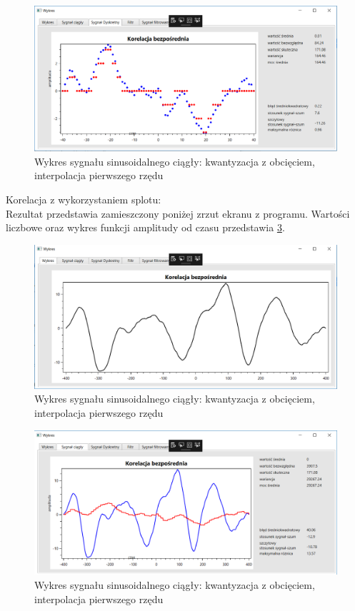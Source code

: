 \documentclass[12pt]{article}
\begin{document}
\newpage
\begin{figure}[h!]
 \centering
 \includegraphics[width=12.3cm]{korBD.PNG}
 \vspace{-0.3cm}
 \caption{Wykres sygnału sinusoidalnego ciągły: kwantyzacja z obcięciem, interpolacja pierwszego rzędu}
 \label{Wykres dla wynikw eksperymentu pierwszego}
\end{figure}

Korelacja z wykorzystaniem splotu:
\\Rezultat przedstawia zamieszczony poniżej zrzut ekranu z programu. Wartości liczbowe oraz wykres funkcji amplitudy od czasu przedstawia \ref{Wykres dla wynikw eksperymentu pierwszego}.
\begin{figure}[h!]
 \centering
 \includegraphics[width=12.3cm]{korB.PNG}
 \vspace{-0.3cm}
 \caption{Wykres sygnału sinusoidalnego ciągły: kwantyzacja z obcięciem, interpolacja pierwszego rzędu}
 \label{Wykres dla wynikw eksperymentu pierwszego}
\end{figure}
 \newpage
\begin{figure}[h!]
 \centering
 \includegraphics[width=12.3cm]{korBC.PNG}
 \vspace{-0.3cm}
 \caption{Wykres sygnału sinusoidalnego ciągły: kwantyzacja z obcięciem, interpolacja pierwszego rzędu}
 \label{Wykres dla wynikw eksperymentu pierwszego}
\end{figure}
\end{document}
